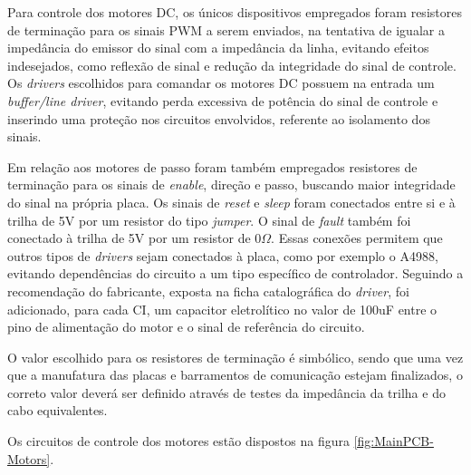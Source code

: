 Para controle dos motores DC, os únicos dispositivos empregados foram
resistores de terminação para os sinais PWM a serem enviados, na tentativa de igualar
a impedância do emissor do sinal com a impedância da linha, 
evitando efeitos indesejados, como reflexão de sinal e redução
da integridade do sinal de controle. Os \textit{drivers} escolhidos para
comandar os motores DC possuem na entrada um \textit{buffer/line driver},
evitando perda excessiva de potência do sinal de controle e inserindo uma 
proteção nos circuitos envolvidos, referente ao isolamento dos sinais.

Em relação aos motores de passo foram também empregados resistores de 
terminação para os sinais de \textit{enable}, direção e passo, buscando 
maior integridade do sinal na própria placa. Os sinais de \textit{reset}
e \textit{sleep} foram conectados entre si e à trilha de 5V por um 
resistor do tipo \textit{jumper}. O sinal de \textit{fault} também 
foi conectado à trilha de 5V por um resistor de $0\Omega$. Essas conexões
permitem que outros tipos de \textit{drivers} sejam conectados à placa,
como por exemplo o A4988, evitando dependências do circuito a um tipo específico de
controlador. 
Seguindo a recomendação do fabricante, exposta na ficha catalográfica do \textit{driver}, 
foi adicionado, para cada CI, um capacitor eletrolítico no valor
de 100uF entre o pino de alimentação do motor e o sinal de referência
do circuito.   

O valor escolhido para os resistores de terminação é simbólico,
sendo que uma vez que a manufatura das placas e barramentos de comunicação
estejam finalizados, o correto valor deverá ser definido através de 
testes da impedância da trilha e do cabo equivalentes.

Os circuitos de controle dos motores estão dispostos na figura \ref{fig:MainPCB-Motors}.

